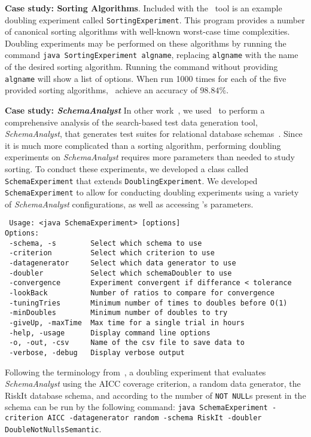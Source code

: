     \lstset{language=bash}

    {\bf Case study: Sorting Algorithms}.  Included with the
    \toolname~tool is an example doubling experiment called
    \texttt{SortingExperiment}.  This program provides a number of
    canonical sorting algorithms with well-known worst-case time
    complexities.  Doubling experiments may be performed on these
    algorithms by running the command \texttt{java SortingExperiment
    algname}, replacing \texttt{algname} with the name of the desired
    sorting algorithm. Running the command without providing
    \texttt{algname} will show a list of options. When run 1000 times
    for each of the five provided sorting algorithms, \toolname~achieve
    an accuracy of $98.84\%$.

    {\bf Case study: \textit{SchemaAnalyst}} In other
    work~\cite{kinneer2015}, we used \toolname~to perform a
    comprehensive analysis of the search-based test data generation
    tool, \textit{SchemaAnalyst}, that generates test suites for
    relational database schemas~\cite{kapfhammer2013}. Since it is much
    more complicated than a sorting algorithm, performing doubling
    experiments on \textit{SchemaAnalyst} requires more parameters than
    needed to study sorting.  To conduct these experiments, we developed
    a class called \texttt{SchemaExperiment} that extends
    \texttt{DoublingExperiment}.  We developed \texttt{SchemaExperiment}
    to allow for conducting doubling experiments using a variety of
    \textit{SchemaAnalyst} configurations, as well as accessing
    \toolname's parameters.

{\scriptsize
\begin{verbatim}
 Usage: <java SchemaExperiment> [options]
Options:
 -schema, -s        Select which schema to use
 -criterion         Select which criterion to use
 -datagenerator     Select which data generator to use
 -doubler           Select which schemaDoubler to use
 -convergence       Experiment convergent if differance < tolerance
 -lookBack          Number of ratios to compare for convergence
 -tuningTries       Minimum number of times to doubles before O(1)
 -minDoubles        Minimum number of doubles to try
 -giveUp, -maxTime  Max time for a single trial in hours
 -help, -usage      Display command line options
 -o, -out, -csv     Name of the csv file to save data to
 -verbose, -debug   Display verbose output
\end{verbatim}
}

Following the terminology from~\cite{kempka2015}, a doubling experiment
that evaluates \textit{SchemaAnalyst} using the AICC coverage criterion,
a random data generator, the RiskIt database schema, and according to
the number of \texttt{NOT NULL}s present in the schema can be run by the
following command: \texttt{java SchemaExperiment -criterion AICC
-datagenerator random -schema RiskIt -doubler DoubleNotNullsSemantic}.


